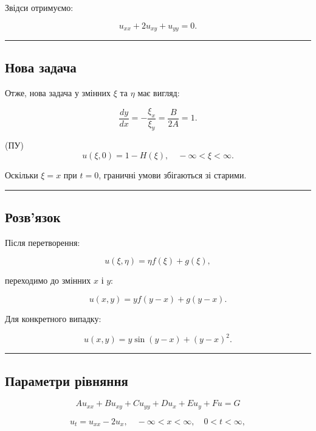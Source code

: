 \documentclass[
  ukrainian,
]{article}
\begin{document}
Звідси отримуємо:

\[
u_{xx} + 2u_{xy} + u_{yy} = 0.
\]

\begin{center}\rule{0.5\linewidth}{0.5pt}\end{center}

\subsection{Нова
задача}\label{ux43dux43eux432ux430-ux437ux430ux434ux430ux447ux430}

Отже, нова задача у змінних \(\xi\) та \(\eta\) має вигляд:

\[
\frac{dy}{dx} = -\frac{\xi_x}{\xi_y} = \frac{B}{2A} = 1.
\]

(ПУ) \[
u(\xi, 0) = 1 - H(\xi), \quad -\infty < \xi < \infty.
\]

Оскільки \(\xi = x\) при \(t = 0\), граничні умови збігаються зі
старими.

\begin{center}\rule{0.5\linewidth}{0.5pt}\end{center}

\subsection{Розв'язок}\label{ux440ux43eux437ux432ux44fux437ux43eux43a}

Після перетворення:

\[
u(\xi, \eta) = \eta f(\xi) + g(\xi),
\]

переходимо до змінних \(x\) і \(y\):

\[
u(x, y) = y f(y - x) + g(y - x).
\]

Для конкретного випадку:

\[
u(x, y) = y \sin(y - x) + (y - x)^2.
\]

\begin{center}\rule{0.5\linewidth}{0.5pt}\end{center}

\subsection{Параметри
рівняння}\label{ux43fux430ux440ux430ux43cux435ux442ux440ux438-ux440ux456ux432ux43dux44fux43dux43dux44f}

\[
A u_{xx} + B u_{xy} + C u_{yy} + D u_x + E u_y + F u = G
\]

\[
u_t = u_{xx} - 2u_x, \quad -\infty < x < \infty, \quad 0 < t < \infty,
\]
\end{document}
